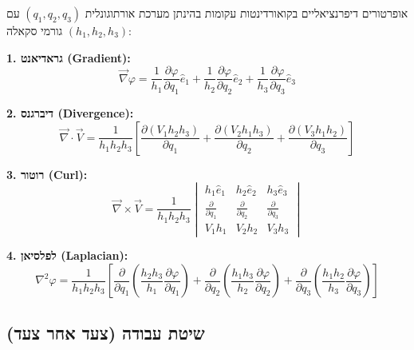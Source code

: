 \documentclass{article}
\begin{document}
\begin{formulabox}{אופרטורים דיפרנציאליים בקואורדינטות עקומות}
בהינתן מערכת אורתוגונלית $(q_1, q_2, q_3)$ עם גורמי סקאלה $(h_1, h_2, h_3)$:

\textbf{1. גראדיאנט (Gradient):}
\[
\vec{\nabla}\varphi = \frac{1}{h_1}\frac{\partial\varphi}{\partial q_1}\hat{e}_1 + \frac{1}{h_2}\frac{\partial\varphi}{\partial q_2}\hat{e}_2 + \frac{1}{h_3}\frac{\partial\varphi}{\partial q_3}\hat{e}_3
\]

\textbf{2. דיברגנס (Divergence):}
\[
\vec{\nabla}\cdot\vec{V} = \frac{1}{h_1h_2h_3}\left[\frac{\partial(V_1h_2h_3)}{\partial q_1} + \frac{\partial(V_2h_1h_3)}{\partial q_2} + \frac{\partial(V_3h_1h_2)}{\partial q_3}\right]
\]

\textbf{3. רוטור (Curl):}
\[
\vec{\nabla}\times\vec{V} = \frac{1}{h_1h_2h_3}\begin{vmatrix}
h_1\hat{e}_1 & h_2\hat{e}_2 & h_3\hat{e}_3 \\
\frac{\partial}{\partial q_1} & \frac{\partial}{\partial q_2} & \frac{\partial}{\partial q_3} \\
V_1h_1 & V_2h_2 & V_3h_3
\end{vmatrix}
\]

\textbf{4. לפלסיאן (Laplacian):}
\[
\nabla^2\varphi = \frac{1}{h_1h_2h_3}\left[\frac{\partial}{\partial q_1}\left(\frac{h_2h_3}{h_1}\frac{\partial\varphi}{\partial q_1}\right) + \frac{\partial}{\partial q_2}\left(\frac{h_1h_3}{h_2}\frac{\partial\varphi}{\partial q_2}\right) + \frac{\partial}{\partial q_3}\left(\frac{h_1h_2}{h_3}\frac{\partial\varphi}{\partial q_3}\right)\right]
\]
\end{formulabox}

\subsection*{שיטת עבודה (צעד אחר צעד)}
\end{document}
